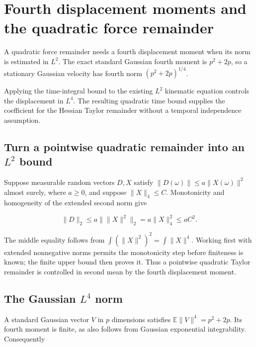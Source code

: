 \documentclass[11pt,a4paper]{report}
\begin{document}
\section{\texorpdfstring{Fourth displacement moments and the quadratic force remainder}{Fourth displacement moments and the quadratic force remainder}}
\label{proof-module-KineticLangevin-LpMomentBounds-lean}


A quadratic force remainder needs a fourth displacement moment when its norm is estimated in \(L^2\). The exact standard Gaussian fourth moment is \(p^2+2p\), so a stationary Gaussian velocity has fourth norm \((p^2+2p)^{1/4}\).



Applying the time-integral bound to the existing \(L^2\) kinematic equation controls the displacement in \(L^4\). The resulting quadratic time bound supplies the coefficient for the Hessian Taylor remainder without a temporal independence assumption.

\subsection{\texorpdfstring{Turn a pointwise quadratic remainder into an \(L^{2}\) bound}{Turn a pointwise quadratic remainder into an L² bound}}
\label{report-step-KineticLangevin-LpMomentBounds-lean-1}


Suppose measurable random vectors \(D,X\) satisfy \(\|D(\omega)\|\le a\|X(\omega)\|^2\) almost surely, where \(a\ge0\), and suppose \(\|X\|_4\le C\). Monotonicity and homogeneity of the extended second norm give

\[\|D\|_2\le a\bigl\|\|X\|^2\bigr\|_2=a\|X\|_4^2\le aC^2.\]

The middle equality follows from \(\int(\|X\|^2)^2=\int\|X\|^4\). Working first with extended nonnegative norms permits the monotonicity step before finiteness is known; the finite upper bound then proves it. Thus a pointwise quadratic Taylor remainder is controlled in second mean by the fourth displacement moment.

\subsection{\texorpdfstring{The Gaussian \(L^{4}\) norm}{The Gaussian L⁴ norm}}
\label{report-step-KineticLangevin-LpMomentBounds-lean-2}


A standard Gaussian vector \(V\) in \(p\) dimensions satisfies \(\mathbb E\|V\|^4=p^2+2p\). Its fourth moment is finite, as also follows from Gaussian exponential integrability. Consequently
\end{document}
